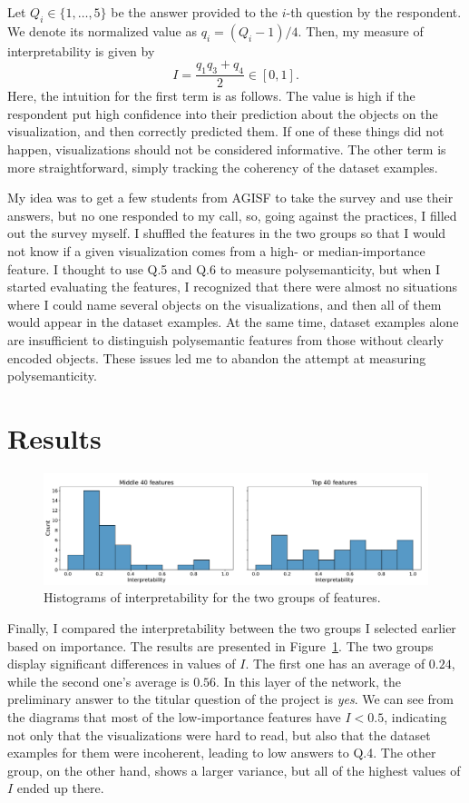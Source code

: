 \documentclass[12pt]{article}
\begin{document}
Let $Q_i\in\{1,\dotsc,5\}$ be the answer provided to the $i$-th question by the respondent. We denote its normalized value as $q_i=(Q_i-1) / 4$. Then, my measure of interpretability is given by
\begin{equation}
  I=\frac{q_1q_3+q_4}{2}\in[0,1].
\end{equation}
Here, the intuition for the first term is as follows. The value is high if the respondent put high confidence into their prediction about the objects on the visualization, and then correctly predicted them. If one of these things did not happen, visualizations should not be considered informative. The other term is more straightforward, simply tracking the coherency of the dataset examples.

My idea was to get a few students from AGISF to take the survey and use their answers, but no one responded to my call, so, going against the practices, I filled out the survey myself. I shuffled the features in the two groups so that I would not know if a given visualization comes from a high- or median-importance feature. I thought to use Q.5 and Q.6 to measure polysemanticity, but when I started evaluating the features, I recognized that there were almost no situations where I could name several objects on the visualizations, and then all of them would appear in the dataset examples. At the same time, dataset examples alone are insufficient to distinguish polysemantic features from those without clearly encoded objects. These issues led me to abandon the attempt at measuring polysemanticity. 

\section{Results}
\begin{figure}[t]
    \centering
    \includegraphics[width=\linewidth]{fig/groups_interp.pdf}
    \caption{Histograms of interpretability for the two groups of features.}
    \label{fig:comp}
\end{figure}
Finally, I compared the interpretability between the two groups I selected earlier based on importance. The results are presented in Figure~\ref{fig:comp}. The two groups display significant differences in values of $I$. The first one has an average of $0.24$, while the second one's average is $0.56$. In this layer of the network, the preliminary answer to the titular question of the project is \textit{yes}. We can see from the diagrams that most of the low-importance features have $I<0.5$, indicating not only that the visualizations were hard to read, but also that the dataset examples for them were incoherent, leading to low answers to Q.4. The other group, on the other hand, shows a larger variance, but all of the highest values of $I$ ended up there.
\end{document}
